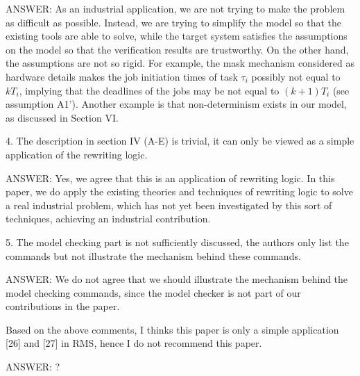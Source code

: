 \documentclass[10pt,journal]{IEEEtran}
\newcommand{\hide}[1]{\ignorespaces}
\begin{document}
ANSWER: As an industrial application, we are not trying to make the
problem as difficult as possible. Instead, we are trying to simplify
the model so that the existing tools are able to solve, while the
target system satisfies the assumptions on the model so that the
verification results are trustworthy. On the other hand, the
assumptions are not so rigid. For example, the mask mechanism
considered as hardware details makes the job initiation times of task
$\tau_i$ possibly not equal to $kT_i$, implying that the deadlines of
the jobs may be not equal to $(k+1)T_i$ (see assumption A1'). Another
example is that non-determinism exists in our model, as discussed in
Section VI.

4. The description in section IV (A-E) is trivial, it can only be
viewed as a simple application of the rewriting logic.

ANSWER: Yes, we agree that this is an application of rewriting
logic. In this paper, we do apply the existing theories and techniques
of rewriting logic to solve a real industrial problem, which has not
yet been investigated by this sort of techniques, achieving an
industrial contribution.

5. The model checking part is not sufficiently discussed, the authors
only list the commands but not illustrate the mechanism behind these
commands.

ANSWER: We do not agree that we should illustrate the mechanism behind
the model checking commands, since the model checker is not part of
our contributions in the paper.

Based on the above comments, I thinks this paper is only a simple
application [26] and [27] in RMS, hence I do not recommend this paper.

ANSWER: ?

\hide{
\ifCLASSOPTIONcompsoc
  \section*{Acknowledgments}
\else
  \section*{Acknowledgment}
\fi

The authors would like to thank...
}

\ifCLASSOPTIONcaptionsoff
  \newpage
\fi
\end{document}
